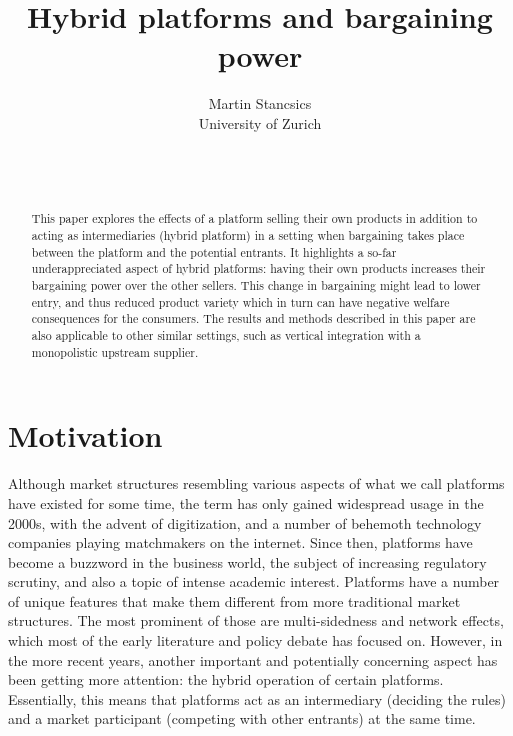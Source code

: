 \documentclass[a4paper]{article}
\title{Hybrid platforms and bargaining power}
\author{Martin Stancsics \\ \normalsize{University of Zurich}}
\date{\thisdraft \\ \firstdraft \\ \latestversion}
\begin{document}
\maketitle

\begin{abstract}
    This paper explores the effects of a platform selling their own products in addition to acting as intermediaries (hybrid platform) in a setting when bargaining takes place between the platform and the potential entrants.
    It highlights a so-far underappreciated aspect of hybrid platforms: having their own products increases their bargaining power over the other sellers.
    This change in bargaining might lead to lower entry, and thus reduced product variety which in turn can have negative welfare consequences for the consumers.
    The results and methods described in this paper are also applicable to other similar settings, such as vertical integration with a monopolistic upstream supplier.
\end{abstract}


\section{Motivation}

Although market structures resembling various aspects of what we call platforms have existed for some time, the term has only gained widespread usage in the 2000s, with the advent of digitization, and a number of behemoth technology companies playing matchmakers on the internet.
Since then, platforms have become a buzzword in the business world, the subject of increasing regulatory scrutiny, and also a topic of intense academic interest.
Platforms have a number of unique features that make them different from more traditional market structures.
The most prominent of those are multi-sidedness and network effects, which most of the early literature \parencite[for an overview, see][]{rochet2006two} and policy debate \parencite[e.g.][]{fletcher2021consumer,calvano2021market} has focused on.
However, in the more recent years, another important and potentially concerning aspect has been getting more attention: the hybrid operation of certain platforms.
Essentially, this means that platforms act as an intermediary (deciding the rules) and a market participant (competing with other entrants) at the same time.
\end{document}
